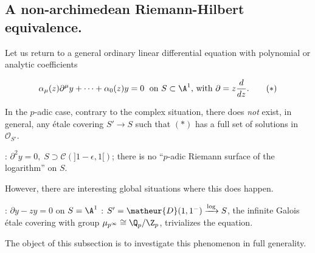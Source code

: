 \subsection{A non-archimedean Riemann-Hilbert equivalence.}\label{sub::3.4} 

\begin{para}\label{para::3.4.1} Let us return to a general ordinary linear
 differential equation with polynomial or analytic coefficients 

 \begin{equation}
  \alpha_\mu(z) \partial^\mu y + \cdots + \alpha_0 (z) y = 0
  \;\text{ on $S\subset \A^1$, with $\partial=z\frac{d}{dz}$}.\tag{$\ast$}
 \end{equation}

 In the $p$-adic case, contrary to the complex situation, there
 does {\it not} exist, in general, any \'etale covering $S'\to S$ such
 that $(\ast)$ has a full set of solutions in $\mathcal{O}_{S'}$.
 
 \medskip{}: $\partial^2 y =0, \;S \supset
 \mathcal{C}(]1-\epsilon, 1[)$; there is no ``$p$-adic Riemann surface 
 of the logarithm'' on $S$.
 
 \medskip However, there are interesting global situations where this
 does happen. 

 \medskip{}: $\partial y - zy =0 $ on $S=\A^1$ :
 $S'=\matheur{D}(1,1^-)\xrightarrow{\log} S$, the infinite
 Galois \'etale covering with group $\mu_{p^\infty}\cong \Q_p/\Z_p$,
 trivializes the equation. 
 
 \medskip\noindent The object of this subsection is to investigate this
 phenomenon in full generality.
\end{para}

